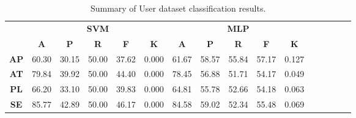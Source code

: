 \begin{landscape}
\begin{table}[htbp]
\footnotesize
\centering
\caption{Summary of User dataset classification results.}
\label{tab:base_female}
\begin{tabular}{|c|c|c|c|c|c|c|c|c|c|c|c|c|c|c|c|}
\hline
\multirow{2}{*}{}	& \multicolumn{5}{c|}{\textbf{SVM}}												& \multicolumn{5}{c|}{\textbf{MLP}}												\\ \cline{2-11} 
					& \textbf{A}	& \textbf{P}	& \textbf{R}	& \textbf{F}	& \textbf{K}	& \textbf{A}	& \textbf{P}	& \textbf{R}	& \textbf{F}	& \textbf{K}	\\ \hline
\textbf{AP}			& 60.30			& 30.15			& 50.00			& 37.62			& 0.000			& 61.67			& 58.57			& 55.84			& 57.17			& 0.127			\\ \hline
\textbf{AT}			& 79.84			& 39.92			& 50.00			& 44.40			& 0.000			& 78.45			& 56.88			& 51.71			& 54.17			& 0.049			\\ \hline
\textbf{PL}			& 66.20			& 33.10			& 50.00			& 39.83			& 0.000			& 64.81			& 55.78			& 52.66			& 54.18			& 0.063			\\ \hline
\textbf{SE}			& 85.77			& 42.89			& 50.00			& 46.17			& 0.000			& 84.58			& 59.02			& 52.34			& 55.48			& 0.069			\\ \hline
\end{tabular}
\end{table}
\end{landscape}